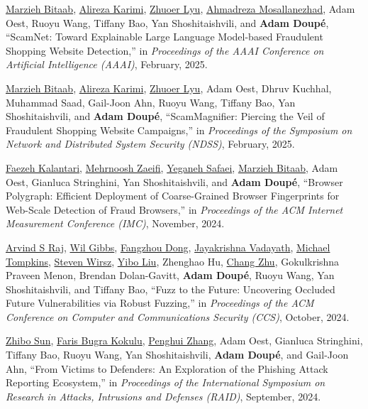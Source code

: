 \documentclass[11pt,letterpaper,sans]{moderncv}
\begin{document}
\begin{etaremune}

\item \underline{Marzieh Bitaab}, \underline{Alireza Karimi}, \underline{Zhuoer Lyu}, \underline{Ahmadreza Mosallanezhad}, Adam Oest, Ruoyu Wang, Tiffany Bao, Yan Shoshitaishvili, and \textbf{Adam Doup\'e}, ``ScamNet: Toward Explainable Large Language Model-based Fraudulent Shopping Website Detection,'' in \emph{Proceedings of the AAAI Conference on Artificial Intelligence (AAAI)}, February, 2025.

\item \underline{Marzieh Bitaab}, \underline{Alireza Karimi}, \underline{Zhuoer Lyu}, Adam Oest, Dhruv Kuchhal, Muhammad Saad, Gail-Joon Ahn, Ruoyu Wang, Tiffany Bao, Yan Shoshitaishvili, and \textbf{Adam Doup\'e}, ``ScamMagnifier: Piercing the Veil of Fraudulent Shopping Website Campaigns,'' in \emph{Proceedings of the Symposium on Network and Distributed System Security (NDSS)}, February, 2025.

\item \underline{Faezeh Kalantari}, \underline{Mehrnoosh Zaeifi}, \underline{Yeganeh Safaei}, \underline{Marzieh Bitaab}, Adam Oest, Gianluca Stringhini, Yan Shoshitaishvili, and \textbf{Adam Doup\'e}, ``Browser Polygraph: Efficient Deployment of Coarse-Grained Browser Fingerprints for Web-Scale Detection of Fraud Browsers,'' in \emph{Proceedings of the ACM Internet Measurement Conference (IMC)}, November, 2024.

\item \underline{Arvind S Raj}, \underline{Wil Gibbs}, \underline{Fangzhou Dong}, \underline{Jayakrishna Vadayath}, \underline{Michael Tompkins}, \underline{Steven Wirsz}, \underline{Yibo Liu}, Zhenghao Hu, \underline{Chang Zhu}, Gokulkrishna Praveen Menon, Brendan Dolan-Gavitt, \textbf{Adam Doup\'e}, Ruoyu Wang, Yan Shoshitaishvili, and Tiffany Bao, ``Fuzz to the Future: Uncovering Occluded Future Vulnerabilities via Robust Fuzzing,'' in \emph{Proceedings of the ACM Conference on Computer and Communications Security (CCS)}, October, 2024.

\item \underline{Zhibo Sun}, \underline{Faris Bugra Kokulu}, \underline{Penghui Zhang}, Adam Oest, Gianluca Stringhini, Tiffany Bao, Ruoyu Wang, Yan Shoshitaishvili, \textbf{Adam Doup\'e}, and Gail-Joon Ahn, ``From Victims to Defenders: An Exploration of the Phishing Attack Reporting Ecosystem,'' in \emph{Proceedings of the International Symposium on Research in Attacks, Intrusions and Defenses (RAID)}, September, 2024.


\end{etaremune}
\end{document}
